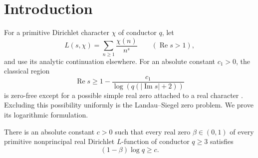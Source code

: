 \section{Introduction}\label{sec:intro}

For a primitive Dirichlet character $\chi$ of conductor $q$, let
\[
 L(s,\chi)=\sum_{n\ge1}\frac{\chi(n)}{n^s}
 \qquad(\operatorname{Re}s>1),
\]
and use its analytic continuation elsewhere. For an absolute constant
$c_1>0$, the classical region
\[
 \operatorname{Re}s\ge1-\frac{c_1}{\log(q(|\operatorname{Im}s|+2))}
\]
is zero-free except for a possible simple real zero attached to a real
character \cite[Section~14]{Davenport}. Excluding this possibility
uniformly is the Landau--Siegel zero problem. We prove its logarithmic
formulation.

\begin{theorem}\label{thm:main}
There is an absolute constant $c>0$ such that every real zero
$\beta\in(0,1)$ of every primitive nonprincipal real Dirichlet
$L$-function of conductor $q\ge3$ satisfies
\begin{equation}\label{eq:main}
 (1-\beta)\log q\ge c.
\end{equation}
\end{theorem}
